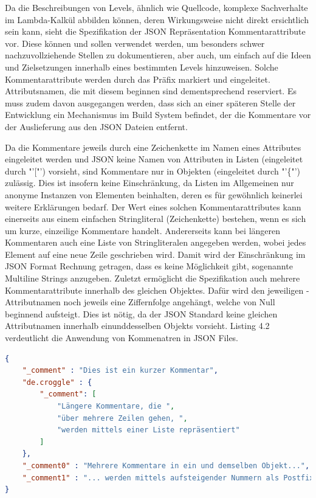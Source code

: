 Da die Beschreibungen von Levels, ähnlich wie Quellcode, komplexe Sachverhalte im Lambda-Kalkül abbilden können, deren Wirkungsweise nicht direkt ersichtlich sein kann,
sieht die Spezifikation der JSON Repräsentation Kommentarattribute vor.
Diese können und sollen verwendet werden, um besonders schwer nachzuvollziehende Stellen zu dokumentieren, aber auch, um einfach auf die Ideen und Zielsetzungen innerhalb eines bestimmten Levels hinzuweisen.
Solche Kommentarattribute werden durch das Präfix  markiert und eingeleitet.
Attributsnamen, die mit diesem beginnen sind dementsprechend reserviert.
Es muss zudem davon ausgegangen werden, dass sich an einer späteren Stelle der Entwicklung ein Mechanismus im Build System befindet, der die Kommentare vor der Auslieferung aus den JSON Dateien entfernt.

Da die Kommentare jeweils durch eine Zeichenkette im Namen eines Attributes eingeleitet werden und JSON keine Namen von Attributen in Listen (eingeleitet durch "'["') vorsieht, sind Kommentare nur in Objekten (eingeleitet durch "'\{"') zulässig.
Dies ist insofern keine Einschränkung, da Listen im Allgemeinen nur anonyme Instanzen von Elementen beinhalten, deren es für gewöhnlich keinerlei weitere Erklärungen bedarf.
Der Wert eines solchen Kommentarattributes kann einerseits aus einem einfachen Stringliteral (Zeichenkette) bestehen, wenn es sich um kurze, einzeilige Kommentare handelt.
Andererseits kann bei längeren Kommentaren auch eine Liste von Stringliteralen angegeben werden, wobei jedes Element auf eine neue Zeile geschrieben wird.
Damit wird der Einschränkung im JSON Format Rechnung getragen, dass es keine Möglichkeit gibt, sogenannte Multiline Strings anzugeben.
Zuletzt ermöglicht die Spezifikation auch mehrere Kommentarattribute innerhalb des gleichen Objektes.
Dafür wird den jeweiligen -Attributnamen noch jeweils eine Ziffernfolge angehängt, welche von Null beginnend aufsteigt.
Dies ist nötig, da der JSON Standard keine gleichen Attributnamen innerhalb einunddesselben Objekts vorsieht.
Listing 4.2 verdeutlicht die Anwendung von Kommenatren in JSON Files.
\begin{lstlisting}[language=json,caption={Kommentare in einer JSON Datei}]
{
	"_comment" : "Dies ist ein kurzer Kommentar",
	"de.croggle" : {
		"_comment": [
			"Längere Kommentare, die ",
			"über mehrere Zeilen gehen, ",
			"werden mittels einer Liste repräsentiert"
		]
	},
	"_comment0" : "Mehrere Kommentare in ein und demselben Objekt...",
	"_comment1" : "... werden mittels aufsteigender Nummern als Postfix unterschieden"
}
\end{lstlisting}

